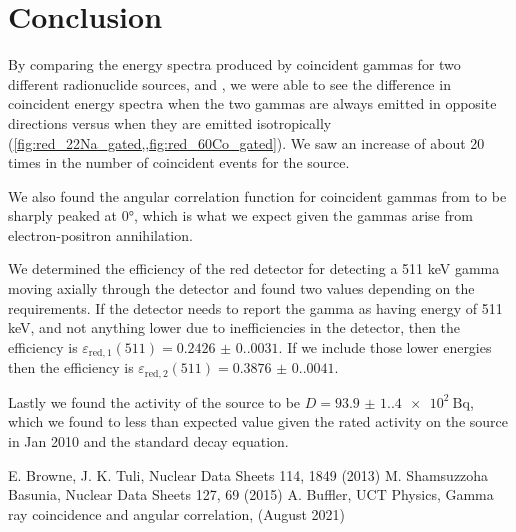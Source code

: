 \documentclass[11pt]{article}
\numberwithin{equation}{section}
\numberwithin{figure}{section}
\numberwithin{table}{section}
\begin{document}
\section{Conclusion}\label{sec:Conclusion}
\par By comparing the energy spectra produced by coincident gammas for two different radionuclide sources,  and , we were able to see the difference in coincident energy spectra when the two gammas are always emitted in opposite directions versus when they are emitted isotropically (\cref{fig:red_22Na_gated,,fig:red_60Co_gated}). We saw an increase of about 20 times in the number of coincident events for the  source. 
\par We also found the angular correlation function for coincident gammas from  to be sharply peaked at $\ang{0}$, which is what we expect given the gammas arise from electron-positron annihilation. 
\par We determined the efficiency of the red detector for detecting a 511 keV gamma moving axially through the detector and found two values depending on the requirements. If the detector needs to report the gamma as having energy of 511 keV, and not anything lower due to inefficiencies in the detector, then the efficiency is $\varepsilon_{\text{red},1}(511)=\num{0.2426(0.0031)}$. If we include those lower energies then the efficiency is $\varepsilon_{\text{red},2}(511)=\num{0.3876(0.0041)}$.
\par Lastly we found the activity of the  source to be $D=\SI{93.9(1.4)e2}{\becquerel}$, which we found to less than expected value given the rated activity on the source in Jan 2010 and the standard decay equation.



\begin{thebibliography}{9}
    E. Browne, J. K. Tuli, Nuclear Data Sheets 114, 1849 (2013)
    M. Shamsuzzoha Basunia, Nuclear Data Sheets 127, 69 (2015)
    A. Buffler, UCT Physics, Gamma ray coincidence and angular correlation, (August 2021)
\end{thebibliography}
\end{document}

